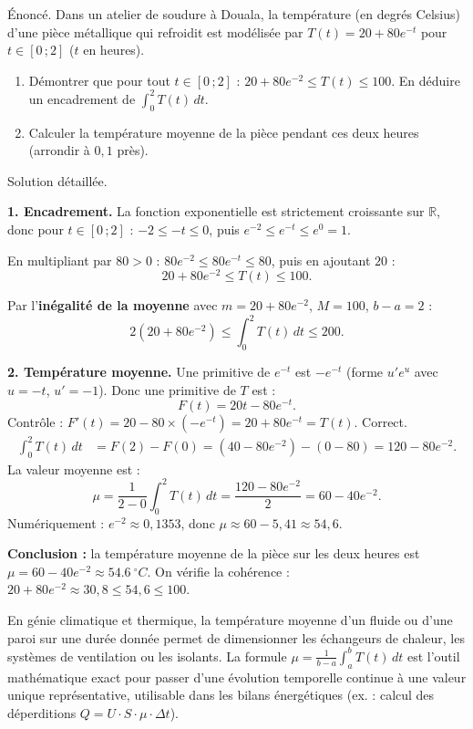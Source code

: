 \documentclass[11pt]{article}
\providecommand{\degree}{^{\circ}}
\begin{document}
\begin{exoresolu}
Énoncé. Dans un atelier de soudure à Douala, la température (en degrés Celsius) d'une pièce métallique qui refroidit est modélisée par $T(t) = 20 + 80e^{-t}$ pour $t \in [0\,;2]$ ($t$ en heures).
\begin{enumerate}
\item Démontrer que pour tout $t \in [0\,;2]$ : $20 + 80e^{-2} \leq T(t) \leq 100$. En déduire un encadrement de $\displaystyle\int_0^2 T(t)\,dt$.
\item Calculer la température moyenne de la pièce pendant ces deux heures (arrondir à $0,1$ près).
\end{enumerate}
\tcblower
Solution détaillée.

\textbf{1. Encadrement.} La fonction exponentielle est strictement croissante sur $\mathbb{R}$, donc pour $t \in [0\,;2]$ : $-2 \leq -t \leq 0$, puis $e^{-2} \leq e^{-t} \leq e^{0} = 1$.

En multipliant par $80 > 0$ : $80e^{-2} \leq 80e^{-t} \leq 80$, puis en ajoutant $20$ :
\[ 20 + 80e^{-2} \leq T(t) \leq 100. \]

Par l'\textbf{inégalité de la moyenne} avec $m = 20 + 80e^{-2}$, $M = 100$, $b - a = 2$ :
\[ 2\left(20 + 80e^{-2}\right) \leq \int_0^2 T(t)\,dt \leq 200. \]

\textbf{2. Température moyenne.} Une primitive de $e^{-t}$ est $-e^{-t}$ (forme $u'e^u$ avec $u = -t$, $u' = -1$). Donc une primitive de $T$ est :
\[ F(t) = 20t - 80e^{-t}. \]
Contrôle : $F'(t) = 20 - 80\times(-e^{-t}) = 20 + 80e^{-t} = T(t)$. Correct.
\begin{align*}
\int_0^2 T(t)\,dt &= F(2) - F(0) = \left(40 - 80e^{-2}\right) - \left(0 - 80\right) = 120 - 80e^{-2}.
\end{align*}
La valeur moyenne est :
\[ \mu = \frac{1}{2-0}\int_0^2 T(t)\,dt = \frac{120 - 80e^{-2}}{2} = 60 - 40e^{-2}. \]
Numériquement : $e^{-2} \approx 0,1353$, donc $\mu \approx 60 - 5,41 \approx 54,6$.

\textbf{Conclusion :} la température moyenne de la pièce sur les deux heures est $\mu = 60 - 40e^{-2} \approx \SI{54,6}{\degree C}$. On vérifie la cohérence : $20 + 80e^{-2} \approx 30,8 \leq 54,6 \leq 100$.
\end{exoresolu}

\begin{savaistu}
En génie climatique et thermique, la température moyenne d'un fluide ou d'une paroi sur une durée donnée permet de dimensionner les échangeurs de chaleur, les systèmes de ventilation ou les isolants. La formule $\mu = \frac{1}{b-a}\int_a^b T(t)\,dt$ est l'outil mathématique exact pour passer d'une évolution temporelle continue à une valeur unique représentative, utilisable dans les bilans énergétiques (ex. : calcul des déperditions $Q = U \cdot S \cdot \mu \cdot \Delta t$).
\end{savaistu}
\end{document}
